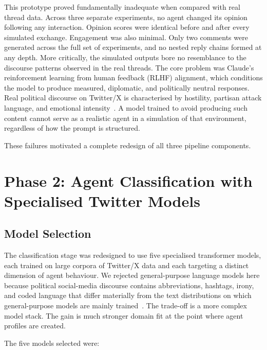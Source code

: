 \documentclass[logo,bsc,singlespacing,parskip,online]{infthesis}
\begin{document}
This prototype proved fundamentally inadequate when compared with real thread data. Across three separate experiments, no agent changed its opinion following any interaction. Opinion scores were identical before and after every simulated exchange. Engagement was also minimal. Only two comments were generated across the full set of experiments, and no nested reply chains formed at any depth. More critically, the simulated outputs bore no resemblance to the discourse patterns observed in the real threads. The core problem was Claude's reinforcement learning from human feedback (RLHF) alignment, which conditions the model to produce measured, diplomatic, and politically neutral responses. Real political discourse on Twitter/X is characterised by hostility, partisan attack language, and emotional intensity~\citep{brady2017emotion,antypas2023negativity}. A model trained to avoid producing such content cannot serve as a realistic agent in a simulation of that environment, regardless of how the prompt is structured.

These failures motivated a complete redesign of all three pipeline components.

\section{Phase 2: Agent Classification with Specialised Twitter Models}

\subsection{Model Selection}

The classification stage was redesigned to use five specialised transformer models, each trained on large corpora of Twitter/X data and each targeting a distinct dimension of agent behaviour. We rejected general-purpose language models here because political social-media discourse contains abbreviations, hashtags, irony, and coded language that differ materially from the text distributions on which general-purpose models are mainly trained~\citep{antypas2023negativity,tun2023sentiment}. The trade-off is a more complex model stack. The gain is much stronger domain fit at the point where agent profiles are created.

The five models selected were:
\end{document}

